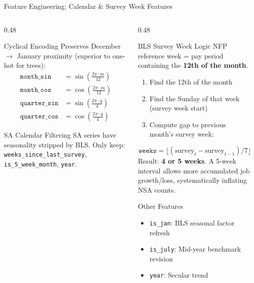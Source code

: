 \documentclass[aspectratio=169,10pt]{beamer}
\begin{document}
\begin{frame}{Feature Engineering: Calendar \& Survey Week Features}
\begin{columns}[T]
\begin{column}{0.48\textwidth}
\begin{block}{Cyclical Encoding}
\footnotesize
Preserves December $\to$ January proximity (superior to one-hot for trees):
\begin{align*}
\texttt{month\_sin} &= \sin\!\left(\frac{2\pi \cdot m}{12}\right) \\
\texttt{month\_cos} &= \cos\!\left(\frac{2\pi \cdot m}{12}\right) \\
\texttt{quarter\_sin} &= \sin\!\left(\frac{2\pi \cdot q}{4}\right) \\
\texttt{quarter\_cos} &= \cos\!\left(\frac{2\pi \cdot q}{4}\right)
\end{align*}
\end{block}

\begin{alertblock}{SA Calendar Filtering}
\scriptsize
SA series have seasonality stripped by BLS. Only keep: \texttt{weeks\_since\_last\_survey}, \texttt{is\_5\_week\_month}, \texttt{year}.
\end{alertblock}
\end{column}
\begin{column}{0.48\textwidth}
\begin{block}{BLS Survey Week Logic}
\footnotesize
NFP reference week = pay period containing the \textbf{12th of the month}.

\begin{enumerate}\scriptsize
  \item Find the 12th of the month
  \item Find the Sunday of that week (survey week start)
  \item Compute gap to previous month's survey week:
\end{enumerate}
\[
\texttt{weeks} = \lfloor (\text{survey}_t - \text{survey}_{t-1}) / 7 \rfloor
\]
Result: \textbf{4 or 5 weeks}. A 5-week interval allows more accumulated job growth/loss, systematically inflating NSA counts.
\end{block}

\begin{block}{Other Features}
\scriptsize
\begin{itemize}
  \item \texttt{is\_jan}: BLS seasonal factor refresh
  \item \texttt{is\_july}: Mid-year benchmark revision
  \item \texttt{year}: Secular trend
\end{itemize}
\end{block}
\end{column}
\end{columns}
\end{frame}
\end{document}
